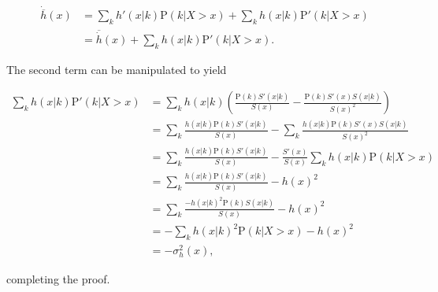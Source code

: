 \documentclass[10pt,twoside,reqno]{article}
\begin{document}
  \[
  \begin{aligned}
  \dot{\overline{h}}(x) &=
  \sum_k h'(x|k)\mathrm{P}(k|X>x) + \sum_k h(x|k)\mathrm{P}'(k|X>x) \\
      &= \overline{\dot{h}}(x) +
      \sum_k h(x|k)\mathrm{P}'(k|X>x).
  \end{aligned}
  \]

  The second term can be manipulated to yield

  \[
  \begin{aligned}
    \sum_k h(x|k)\mathrm{P}'(k|X>x) &=
    \sum_k h(x|k) \left(
        \frac {\mathrm{P}(k)S'(x|k)} {S(x)} -
        \frac {\mathrm{P}(k)S'(x)S(x|k)} {S(x)^2}
      \right) \\
    &=
    \sum_k \frac {h(x|k)\mathrm{P}(k)S'(x|k)} {S(x)} -
    \sum_k \frac {h(x|k)\mathrm{P}(k)S'(x)S(x|k)} {S(x)^2}  \\
    &=
    \sum_k \frac {h(x|k) \mathrm{P}(k)S'(x|k)} {S(x)} -
    \frac {S'(x)} {S(x)} \sum_k h(x|k) \mathrm{P}(k|X>x) \\
    &=
    \sum_k \frac {h(x|k) \mathrm{P}(k)S'(x|k)} {S(x)} - h(x)^2 \\
    &=
    \sum_k \frac {-h(x|k)^2 \mathrm{P}(k)S(x|k)} {S(x)} - h(x)^2 \\
    &=
    -\sum_k h(x|k)^2 \mathrm{P}(k|X>x) - h(x)^2 \\
    &= 
    -\sigma^2_h(x),
  \end{aligned}
  \]

  completing the proof.



\cleardoublepage
\end{document}
